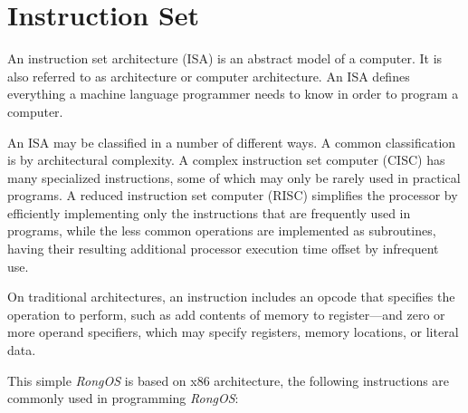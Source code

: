 \documentclass{swfcthesis}
\begin{document}
\section{Instruction Set}

An instruction set architecture (ISA) is an abstract model of a computer. It is also
referred to as architecture or computer architecture. An ISA defines everything a machine
language programmer needs to know in order to program a computer.

An ISA may be classified in a number of different ways. A common classification is by
architectural complexity. A complex instruction set computer (CISC) has many specialized
instructions, some of which may only be rarely used in practical programs. A reduced
instruction set computer (RISC) simplifies the processor by efficiently implementing only
the instructions that are frequently used in programs, while the less common operations
are implemented as subroutines, having their resulting additional processor execution time
offset by infrequent use.

On traditional architectures, an instruction includes an opcode that specifies the
operation to perform, such as add contents of memory to register—and zero or more operand
specifiers, which may specify registers, memory locations, or literal data\cite{wiki:isa}.

This simple \emph{RongOS} is based on x86 architecture, the following instructions are commonly
used in programming \emph{RongOS}:%
\end{document}
